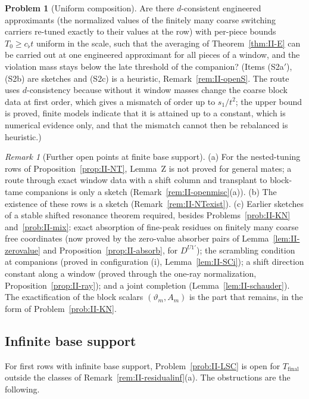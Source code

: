 \documentclass[10pt]{amsart}
\theoremstyle{definition}
\newtheorem{problem}[theorem]{Problem}
\theoremstyle{remark}
\newtheorem{remark}[theorem]{Remark}
\begin{document}
\begin{problem}[Uniform composition]\label{prob:II-S2}
Are there $d$-consistent engineered approximants (the normalized values of
the finitely many coarse switching carriers re-tuned exactly to their
values at the row) with per-piece bounds $T_0\ge c_\flat t$ uniform in the
scale, such that the averaging of Theorem~\ref{thm:II-E} can be carried out
at one engineered approximant for all pieces of a window, and the
violation mass stays below the late threshold of the companion?  (Items
(S2a$'$), (S2b) are sketches and (S2c) is a heuristic,
Remark~\ref{rem:II-openS}.  The route uses $d$-consistency because without
it window masses change the coarse block data at first order, which gives a
mismatch of order up to $s_1/t^2$; the upper bound is proved, finite models
indicate that it is attained up to a constant, which is numerical evidence
only, and that the mismatch cannot then be rebalanced is heuristic.)
\end{problem}


\begin{remark}[Further open points at finite base support]\label{rem:II-statusfin}
(a) For the nested-tuning rows of Proposition~\ref{prop:II-NT}, Lemma~Z is
not proved for general mates; a route through exact window data with a
shift column and transplant to block-tame companions is only a sketch
(Remark~\ref{rem:II-openmisc}(a)).  (b) The existence of these rows is a
sketch (Remark~\ref{rem:II-NTexist}).  (c) Earlier sketches of a stable
shifted resonance theorem required, besides Problems~\ref{prob:II-KN}
and~\ref{prob:II-mix}: exact absorption of fine-peak residues on finitely
many coarse free coordinates (now proved by the zero-value absorber pairs
of Lemma~\ref{lem:II-zerovalue} and Proposition~\ref{prop:II-absorb}, for
$D^{U1'}$); the scrambling condition at companions (proved in configuration
(i), Lemma~\ref{lem:II-SCi}); a shift direction constant along a window
(proved through the one-ray normalization, Proposition~\ref{prop:II-ray});
and a joint completion (Lemma~\ref{lem:II-schauder}).  The exactification
of the block scalars $(\vartheta_m,A_m)$ is the part that remains, in the
form of Problem~\ref{prob:II-KN}.
\end{remark}

\subsection{Infinite base support}
For first rows with infinite base support, Problem~\ref{prob:II-LSC} is
open for $T_{\mathrm{final}}$ outside the classes of
Remark~\ref{rem:II-residualinf}(a).  The obstructions are the following.
\end{document}
